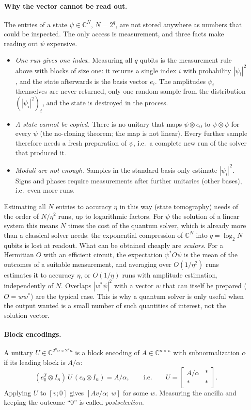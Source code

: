 \documentclass[11pt,a4paper]{article}
\newcommand{\C}{\mathbb{C}}
\begin{document}
\paragraph{Why the vector cannot be read out.} The entries of a state
$\psi\in\C^N$, $N=2^q$, are not stored anywhere as numbers that could be
inspected. The only access is measurement, and three facts make reading
out $\psi$ expensive.
\begin{itemize}
\item \emph{One run gives one index.} Measuring all $q$ qubits is the measurement
  rule above with blocks of size one: it returns a single index $i$ with
  probability $|\psi_i|^2$, and the state afterwards is the basis vector $e_i$.
  The amplitudes $\psi_i$ themselves are never returned, only one random
  sample from the distribution $(|\psi_i|^2)_i$, and the state is destroyed in
  the process.
\item \emph{A state cannot be copied.} There is no unitary that maps
  $\psi\otimes e_0$ to $\psi\otimes\psi$ for every $\psi$ (the no-cloning theorem; the map is
  not linear). Every further sample therefore needs a fresh preparation
  of $\psi$, i.e.\ a complete new run of the solver that produced it.
\item \emph{Moduli are not enough.} Samples in the standard basis only
  estimate $|\psi_i|^2$. Signs and phases require measurements after further
  unitaries (other bases), i.e.\ even more runs.
\end{itemize}
Estimating all $N$ entries to accuracy $\eta$ in this way (state tomography)
needs of the order of $N/\eta^2$ runs, up to logarithmic factors. For $\psi$
the solution of a linear system this means $N$ times the cost of the
quantum solver, which is already more than a classical solver needs: the
exponential compression of $\C^N$ into $q=\log_2N$ qubits is lost at
readout. What can be obtained cheaply are \emph{scalars}. For a Hermitian
$O$ with an efficient circuit, the expectation $\psi^*O\psi$ is the mean of the
outcomes of a suitable measurement, and averaging over $O(1/\eta^2)$ runs
estimates it to accuracy $\eta$, or $O(1/\eta)$ runs with amplitude estimation,
independently of $N$. Overlaps $|w^*\psi|^2$ with a vector $w$ that can itself be
prepared ($O=ww^*$) are the typical case. This is why a quantum solver is
only useful when the output wanted is a small number of such quantities
of interest, not the solution vector.

\paragraph{Block encodings.} A unitary $U\in\C^{2^an\times2^an}$ is a block encoding of
$A\in\C^{n\times n}$ with subnormalization $\alpha$ if its leading block is $A/\alpha$:
\[
(e_0^T\otimes I_n)\,U\,(e_0\otimes I_n)=A/\alpha,\qquad\text{i.e.}\qquad
U=\begin{bmatrix}A/\alpha & *\\ * & *\end{bmatrix}.
\]
Applying $U$ to $[v;0]$ gives $[Av/\alpha;\ w]$ for some $w$. Measuring the
ancilla and keeping the outcome ``$0$'' is called \emph{postselection}.
\end{document}
